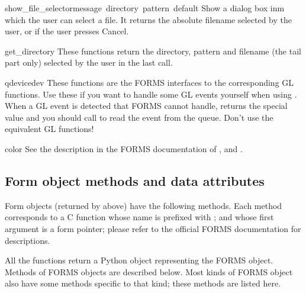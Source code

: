 \begin{funcdesc}{show_file_selector}{message\, directory\, pattern\, default}
Show a dialog box inm which the user can select a file.  It returns
the absolute filename selected by the user, or  if the user
presses Cancel.
\end{funcdesc}

\begin{funcdesc}{get_directory}{}
These functions return the directory, pattern and filename (the tail
part only) selected by the user in the last 
call.
\end{funcdesc}

\begin{funcdesc}{qdevice}{dev}
These functions are the FORMS interfaces to the corresponding GL
functions.  Use these if you want to handle some GL events yourself
when using .  When a GL event is detected that
FORMS cannot handle,  returns the special value
 and you should call  to read the
event from the queue.  Don't use the equivalent GL functions!
\end{funcdesc}

\begin{funcdesc}{color}{}
See the description in the FORMS documentation of ,
 and .
\end{funcdesc}

\subsection{Form object methods and data attributes}

Form objects (returned by  above) have the
following methods.  Each method corresponds to a C function whose name
is prefixed with ; and whose first argument is a form
pointer; please refer to the official FORMS documentation for
descriptions.

All the  functions return a Python object representing
the FORMS object.  Methods of FORMS objects are described below.  Most
kinds of FORMS object also have some methods specific to that kind;
these methods are listed here.

